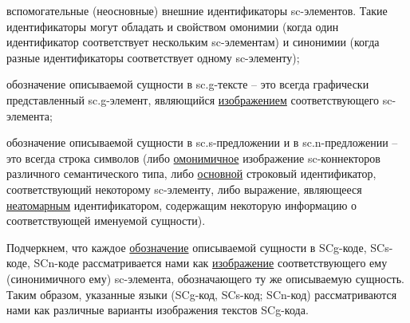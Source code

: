 \begin{SCn}
\begin{scnstruct}
{\begin{scnitemize}
            \item{вспомогательные (неосновные) внешние идентификаторы sc-элементов. Такие идентификаторы могут обладать и свойством омонимии (когда один идентификатор соответствует нескольким sc-элементам) и синонимии (когда разные идентификаторы соответствует одному sc-элементу);}
            \item{обозначение описываемой сущности в sc.g-тексте -- это всегда графически представленный sc.g-элемент, являющийся \uline{изображением} соответствующего sc-элемента;}
            \item{обозначение описываемой сущности в sc.s-предложении и в sc.n-предложении -- это всегда строка символов (либо \uline{омонимичное} изображение sc-коннекторов различного семантического типа, либо \uline{основной} строковый идентификатор, соответствующий некоторому sc-элементу, либо выражение, являющееся \uline{неатомарным} идентификатором, содержащим некоторую информацию о соответствующей именуемой сущности).}
        \end{scnitemize}
        Подчеркнем, что каждое \uline{обозначение} описываемой сущности в SCg-коде, SCs-коде, SCn-коде рассматривается нами как \uline{изображение} соответствующего ему (синонимичного ему) sc-элемента, обозначающего ту же описываемую сущность. Таким образом, указанные языки (SCg-код, SCs-код; SCn-код) рассматриваются нами как различные варианты изображения текстов SCg-кода.}

\end{scnstruct}
\end{SCn}
